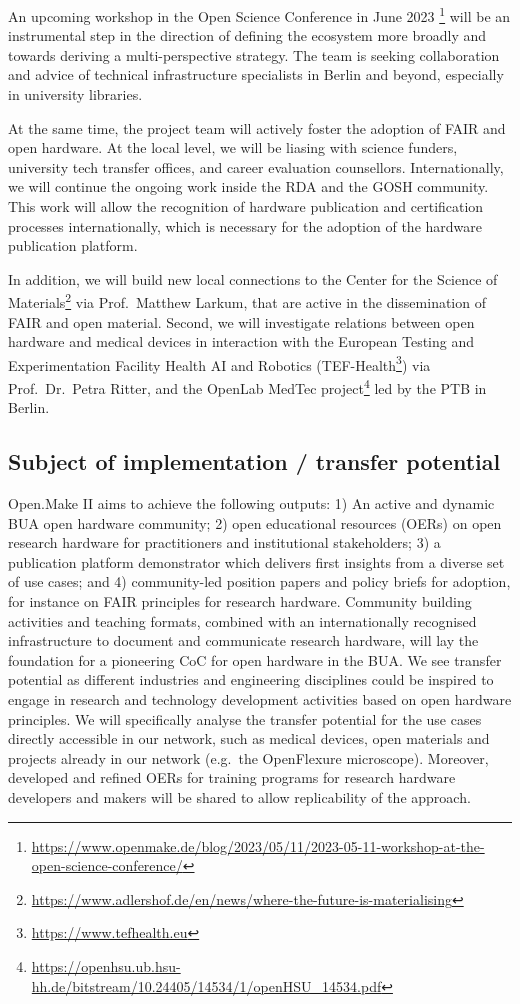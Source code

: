 \documentclass[
  12pt,
  a4paper,
]{article}
\begin{document}
An upcoming workshop in the Open Science Conference in June 2023
\footnote{\url{https://www.openmake.de/blog/2023/05/11/2023-05-11-workshop-at-the-open-science-conference/}}
will be an instrumental step in the direction of defining the ecosystem
more broadly and towards deriving a multi-perspective strategy. The team
is seeking collaboration and advice of technical infrastructure
specialists in Berlin and beyond, especially in university libraries.

At the same time, the project team will actively foster the adoption of
FAIR and open hardware. At the local level, we will be liasing with
science funders, university tech transfer offices, and career evaluation
counsellors. Internationally, we will continue the ongoing work inside
the RDA and the GOSH community. This work will allow the recognition of
hardware publication and certification processes internationally, which
is necessary for the adoption of the hardware publication platform.

In addition, we will build new local connections to the Center for the
Science of Materials\footnote{\url{https://www.adlershof.de/en/news/where-the-future-is-materialising}}
via Prof.~Matthew Larkum, that are active in the dissemination of FAIR
and open material. Second, we will investigate relations between open
hardware and medical devices in interaction with the European Testing
and Experimentation Facility Health AI and Robotics
(TEF-Health\footnote{\url{https://www.tefhealth.eu}}) via
Prof.~Dr.~Petra Ritter, and the OpenLab MedTec project\footnote{\url{https://openhsu.ub.hsu-hh.de/bitstream/10.24405/14534/1/openHSU_14534.pdf}}
led by the PTB in Berlin.

\hypertarget{subject-of-implementation-transfer-potential}{%
\subsection{Subject of implementation / transfer
potential}\label{subject-of-implementation-transfer-potential}}

Open.Make II aims to achieve the following outputs: 1) An active and
dynamic BUA open hardware community; 2) open educational resources
(OERs) on open research hardware for practitioners and institutional
stakeholders; 3) a publication platform demonstrator which delivers
first insights from a diverse set of use cases; and 4) community-led
position papers and policy briefs for adoption, for instance on FAIR
principles for research hardware. Community building activities and
teaching formats, combined with an internationally recognised
infrastructure to document and communicate research hardware, will lay
the foundation for a pioneering CoC for open hardware in the BUA. We see
transfer potential as different industries and engineering disciplines
could be inspired to engage in research and technology development
activities based on open hardware principles. We will specifically
analyse the transfer potential for the use cases directly accessible in
our network, such as medical devices, open materials and projects
already in our network (e.g.~the OpenFlexure microscope). Moreover,
developed and refined OERs for training programs for research hardware
developers and makers will be shared to allow replicability of the
approach.
\end{document}
